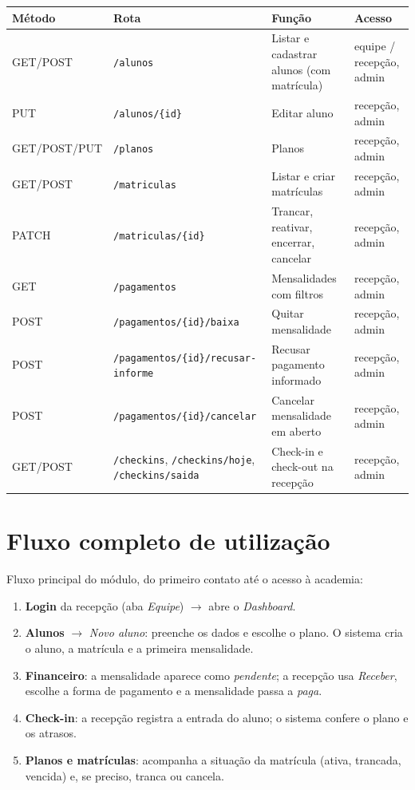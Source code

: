 \documentclass[11pt,a4paper,final]{article}
\newcommand{\cod}[1]{\texttt{#1}}
\begin{document}
\begin{xltabular}{\textwidth}{l l Y l}
  \toprule
  \textbf{Método} & \textbf{Rota} & \textbf{Função} & \textbf{Acesso} \\
  \midrule
  \endhead
  GET/POST  & \cod{/alunos}                       & Listar e cadastrar alunos (com matrícula) & equipe / recepção, admin \\
  PUT       & \cod{/alunos/\{id\}}                & Editar aluno                              & recepção, admin \\
  GET/POST/PUT & \cod{/planos}                    & Planos                                    & recepção, admin \\
  GET/POST  & \cod{/matriculas}                   & Listar e criar matrículas                 & recepção, admin \\
  PATCH     & \cod{/matriculas/\{id\}}            & Trancar, reativar, encerrar, cancelar     & recepção, admin \\
  GET       & \cod{/pagamentos}                   & Mensalidades com filtros                  & recepção, admin \\
  POST      & \cod{/pagamentos/\{id\}/baixa}      & Quitar mensalidade                        & recepção, admin \\
  POST      & \cod{/pagamentos/\{id\}/recusar-informe} & Recusar pagamento informado          & recepção, admin \\
  POST      & \cod{/pagamentos/\{id\}/cancelar}   & Cancelar mensalidade em aberto            & recepção, admin \\
  GET/POST  & \cod{/checkins}, \cod{/checkins/hoje}, \cod{/checkins/saida} & Check-in e check-out na recepção & recepção, admin \\
  \bottomrule
\end{xltabular}

\section{Fluxo completo de utilização}\label{sec:fluxo}

Fluxo principal do módulo, do primeiro contato até o acesso à academia:

\begin{enumerate}
  \item \textbf{Login} da recepção (aba \textit{Equipe}) $\rightarrow$ abre o \textit{Dashboard}.
  \item \textbf{Alunos} $\rightarrow$ \textit{Novo aluno}: preenche os dados e escolhe o plano. O sistema cria o
        aluno, a matrícula e a primeira mensalidade.
  \item \textbf{Financeiro}: a mensalidade aparece como \textit{pendente}; a recepção usa \textit{Receber},
        escolhe a forma de pagamento e a mensalidade passa a \textit{paga}.
  \item \textbf{Check-in}: a recepção registra a entrada do aluno; o sistema confere o plano e os atrasos.
  \item \textbf{Planos e matrículas}: acompanha a situação da matrícula (ativa, trancada, vencida) e,
        se preciso, tranca ou cancela.
\end{enumerate}
\end{document}

